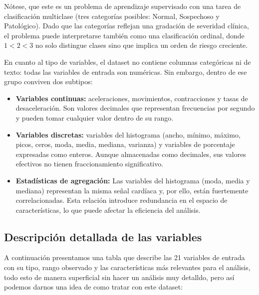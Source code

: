 \documentclass[12pt,letterpaper]{article}
\begin{document}
Nótese, que este es un problema de aprendizaje supervisado con una tarea de clasificación multiclase
(tres categorías posibles: Normal, Sospechoso y Patológico). Dado que las categorías reflejan una
gradación de severidad clínica, el problema puede interpretarse también como una clasificación
ordinal, donde $1 < 2 < 3$ no solo distingue clases sino que implica un orden de riesgo creciente.

En cuanto al tipo de variables, el dataset no contiene columnas categóricas ni de texto: todas las
variables de entrada son numéricas. Sin embargo, dentro de ese grupo conviven dos subtipos:

\begin{itemize}[leftmargin=2em, itemsep=4pt]
  \item \textbf{Variables continuas:} aceleraciones, movimientos, contracciones y tasas de
  desaceleración. Son valores decimales que representan frecuencias por segundo y pueden tomar
  cualquier valor dentro de su rango.

  \item \textbf{Variables discretas:} variables del histograma (ancho, mínimo, máximo, picos,
  ceros, moda, media, mediana, varianza) y variables de porcentaje expresadas como enteros. Aunque
  almacenadas como decimales, sus valores efectivos no tienen fraccionamiento significativo.

  \item \textbf{Estadísticas de agregación:} Las variables del histograma (moda, media y mediana) representan la misma señal cardíaca y, por ello, están fuertemente correlacionadas. Esta relación introduce redundancia en el espacio de características, lo que puede afectar la eficiencia del análisis.
\end{itemize}

\subsection{Descripción detallada de las variables}

A continuación presentamos una tabla que describe las 21 variables de entrada con su tipo, rango
observado y las características más relevantes para el análisis, todo esto de manera superficial
sin hacer un análisis muy detalldo, pero así podemos darnos una idea de como tratar con este
dataset:
\end{document}
